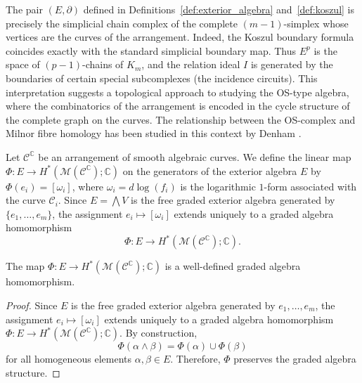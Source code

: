 \documentclass[article,11pt]{amsart} \numberwithin{equation}{section}
\numberwithin{equation}{section}
\begin{document}
{\begin{rk}
	\label{rmk:simplicial_koszul}
	The pair $(E,\partial)$ defined in Definitions~\ref{def:exterior_algebra} and~\ref{def:koszul} is precisely the simplicial chain complex of the complete $(m-1)$-simplex whose vertices are the curves of the arrangement. Indeed, the Koszul boundary formula coincides exactly with the standard simplicial boundary map. Thus $E^p$ is the space of $(p-1)$-chains of $K_m$, and the relation ideal $I$ is generated by the boundaries of certain special subcomplexes (the incidence circuits). This interpretation suggests a topological approach to studying the OS-type algebra, where the combinatorics of the arrangement is encoded in the cycle structure of the complete graph on the curves. The relationship between the OS-complex and Milnor fibre homology has been studied in this context by Denham \cite{Denham2002}.
\end{rk}

\begin{df}\label{cano:coho}
	Let $\mathcal{C}^\mathbb{C}$ be an arrangement of smooth algebraic curves. We define the linear map $\Phi: E \longrightarrow H^*(\mathcal{M}(\mathcal{C}^\mathbb{C}); \mathbb{C})$ on the generators of the exterior algebra $E$ by $\Phi(e_i) = [\omega_i]$, where $\omega_i = d \log(f_i)$ is the logarithmic $1$-form associated with the curve $\mathscr{C}_i$. Since $E = \bigwedge V$ is the free graded exterior algebra generated by $\{e_1,\dots,e_m\}$, the assignment $e_i \longmapsto [\omega_i]$ extends uniquely to a graded algebra homomorphism
	\[
	\Phi: E \longrightarrow H^*(\mathcal{M}(\mathcal{C}^\mathbb{C}); \mathbb{C}).
	\]
\end{df}

\begin{lm}
	The map $\Phi: E \longrightarrow H^*(\mathcal{M}(\mathcal{C}^\mathbb{C}); \mathbb{C})$ is a well-defined graded algebra homomorphism.
\end{lm}

\begin{proof}
	Since $E$ is the free graded exterior algebra generated by $e_1,\dots,e_m$, the assignment $e_i \longmapsto [\omega_i]$ extends uniquely to a graded algebra homomorphism $\Phi: E \longrightarrow H^*(\mathcal{M}(\mathcal{C}^\mathbb{C}); \mathbb{C})$. By construction,
	\[
	\Phi(\alpha \wedge \beta) = \Phi(\alpha) \cup \Phi(\beta)
	\]
	for all homogeneous elements $\alpha,\beta \in E$. Therefore, $\Phi$ preserves the graded algebra structure.
\end{proof}

}
\end{document}
